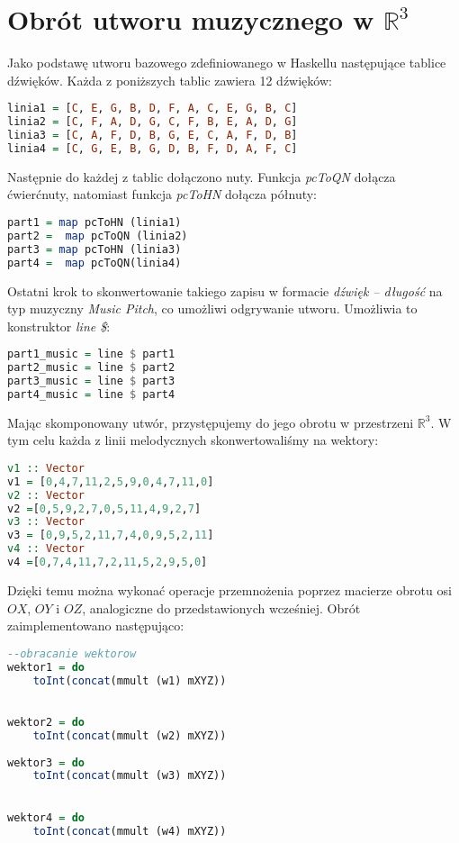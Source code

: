 \section{Obrót utworu muzycznego w \texorpdfstring{$\mathbb{R}^{3}$}{R3}}

Jako podstawę utworu bazowego zdefiniowanego w Haskellu następujące tablice dźwięków. Każda z poniższych tablic zawiera 12 dźwięków:
\begin{lstlisting}[language = Haskell]
linia1 = [C, E, G, B, D, F, A, C, E, G, B, C] 
linia2 = [C, F, A, D, G, C, F, B, E, A, D, G] 
linia3 = [C, A, F, D, B, G, E, C, A, F, D, B]
linia4 = [C, G, E, B, G, D, B, F, D, A, F, C] 
\end{lstlisting}
Następnie do każdej z tablic dołączono nuty. Funkcja \textit{pcToQN} dołącza ćwierćnuty, natomiast funkcja \textit{pcToHN} dołącza półnuty:
\begin{lstlisting}[language = Haskell]
part1 = map pcToHN (linia1)
part2 =  map pcToQN (linia2)
part3 = map pcToHN (linia3)
part4 =  map pcToQN(linia4)
\end{lstlisting}
Ostatni krok to skonwertowanie takiego zapisu w formacie \textit{dźwięk -- długość} na typ muzyczny \textit{Music Pitch}, co umożliwi odgrywanie utworu. Umożliwia to konstruktor \textit{line \$}:
\begin{lstlisting}[language = Haskell]
part1_music = line $ part1
part2_music = line $ part2
part3_music = line $ part3
part4_music = line $ part4
\end{lstlisting}
Mając skomponowany utwór, przystępujemy do jego obrotu w przestrzeni $\mathbb{R}^{3}$. W tym celu każda z linii melodycznych skonwertowaliśmy na wektory:
\begin{lstlisting}[language = Haskell]
v1 :: Vector
v1 = [0,4,7,11,2,5,9,0,4,7,11,0]
v2 :: Vector
v2 =[0,5,9,2,7,0,5,11,4,9,2,7]
v3 :: Vector
v3 = [0,9,5,2,11,7,4,0,9,5,2,11]
v4 :: Vector
v4 =[0,7,4,11,7,2,11,5,2,9,5,0]
\end{lstlisting}
Dzięki temu można wykonać operacje przemnożenia poprzez macierze obrotu osi $OX$, $OY$ i $OZ$, analogiczne do przedstawionych wcześniej.
Obrót zaimplementowano następująco:
\begin{lstlisting}[language = Haskell]
--obracanie wektorow
wektor1 = do
    toInt(concat(mmult (w1) mXYZ))
    

wektor2 = do
    toInt(concat(mmult (w2) mXYZ))
    
wektor3 = do
    toInt(concat(mmult (w3) mXYZ))
    

wektor4 = do
    toInt(concat(mmult (w4) mXYZ))
\end{lstlisting}

